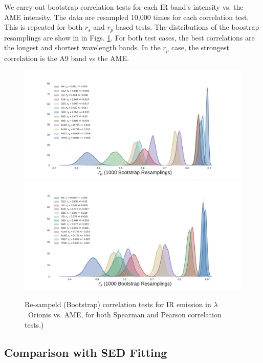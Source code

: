             We carry out bootstrap correlation tests for each IR band's intensity vs. the AME intensity. The data are resampled 10,000 times for each correlation test. This is repeated for both $r_{s}$ and $r_{p}$ based tests. The distributions of the boostrap resamplings are show in in Figs. \ref{fig:bootstrap_vs_AME}. For both test cases, the best correlations are the longest and shortest wavelength bands. In the $r_{p}$ case, the strongest correlation is the A9 band vs the AME.

            \begin{figure}
              \includegraphics[width=\textwidth]{../Plots/ch_lori/bootstrap_vs_AME_pearson_i1000.pdf}
              \includegraphics[width=\textwidth]{../Plots/ch_lori/bootstrap_vs_AME_spearman_i1000.pdf}
              \centering
              \caption{Re-sampeld (Bootstrap) correlation tests for IR emission in $\lambda$~Orionis vs. AME, for both Spearman and Pearson correlation tests.)
              }
              \label{fig:bootstrap_vs_AME}
            \end{figure}


        \subsection{Comparison with SED Fitting}


